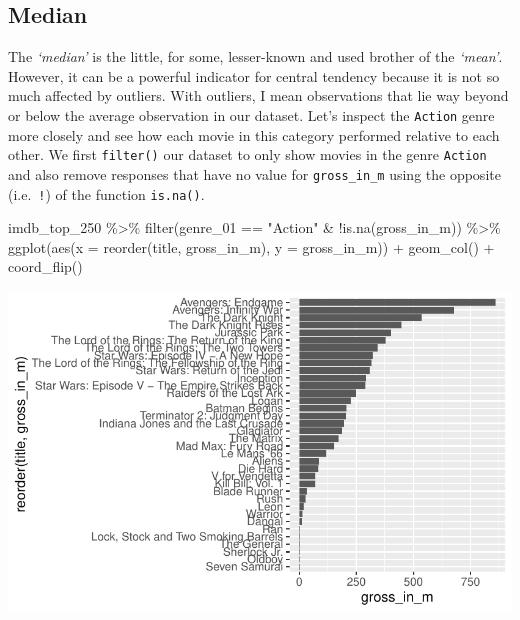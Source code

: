 \documentclass[
  letterpaper,
]{krantz}
\makeatletter
\newenvironment{Shaded}{\begin{snugshade}}{\end{snugshade}}
\newcommand{\AttributeTok}[1]{\textcolor[rgb]{0.40,0.45,0.13}{#1}}
\newcommand{\FunctionTok}[1]{\textcolor[rgb]{0.28,0.35,0.67}{#1}}
\newcommand{\NormalTok}[1]{\textcolor[rgb]{0.00,0.23,0.31}{#1}}
\newcommand{\SpecialCharTok}[1]{\textcolor[rgb]{0.37,0.37,0.37}{#1}}
\newcommand{\StringTok}[1]{\textcolor[rgb]{0.13,0.47,0.30}{#1}}
\newenvironment{kframe}{%
\medskip{}
\setlength{\fboxsep}{.8em}
 \def\at@end@of@kframe{}%
 \ifinner\ifhmode%
  \def\at@end@of@kframe{\end{minipage}}%
  \begin{minipage}{\columnwidth}%
 \fi\fi%
 \def\FrameCommand##1{\hskip\@totalleftmargin \hskip-\fboxsep
 \colorbox{shadecolor}{##1}\hskip-\fboxsep
     \hskip-\linewidth \hskip-\@totalleftmargin \hskip\columnwidth}%
 \MakeFramed {\advance\hsize-\width
   \@totalleftmargin\z@ \linewidth\hsize
   \@setminipage}}%
 {\par\unskip\endMakeFramed%
 \at@end@of@kframe}
\renewenvironment{Shaded}{\begin{kframe}}{\end{kframe}}
\makeatother
\begin{document}
\subsection{Median}\label{median}

The \emph{`median'} is the little, for some, lesser-known and used
brother of the \emph{`mean'}. However, it can be a powerful indicator
for central tendency because it is not so much affected by outliers.
With outliers, I mean observations that lie way beyond or below the
average observation in our dataset. Let's inspect the \texttt{Action}
genre more closely and see how each movie in this category performed
relative to each other. We first \texttt{filter()} our dataset to only
show movies in the genre \texttt{Action} and also remove responses that
have no value for \texttt{gross\_in\_m} using the opposite
(i.e.~\texttt{!}) of the function \texttt{is.na()}.

\begin{Shaded}
\begin{Highlighting}[]
\NormalTok{imdb\_top\_250 }\SpecialCharTok{\%\textgreater{}\%}
  \FunctionTok{filter}\NormalTok{(genre\_01 }\SpecialCharTok{==} \StringTok{"Action"} \SpecialCharTok{\&} \SpecialCharTok{!}\FunctionTok{is.na}\NormalTok{(gross\_in\_m)) }\SpecialCharTok{\%\textgreater{}\%}
  \FunctionTok{ggplot}\NormalTok{(}\FunctionTok{aes}\NormalTok{(}\AttributeTok{x =} \FunctionTok{reorder}\NormalTok{(title, gross\_in\_m),}
             \AttributeTok{y =}\NormalTok{ gross\_in\_m)) }\SpecialCharTok{+}
  \FunctionTok{geom\_col}\NormalTok{() }\SpecialCharTok{+}
  \FunctionTok{coord\_flip}\NormalTok{()}
\end{Highlighting}
\end{Shaded}

\includegraphics{08_descriptive_statistics_files/figure-pdf/earnings-action-movies-barplot-1.pdf}
\end{document}
